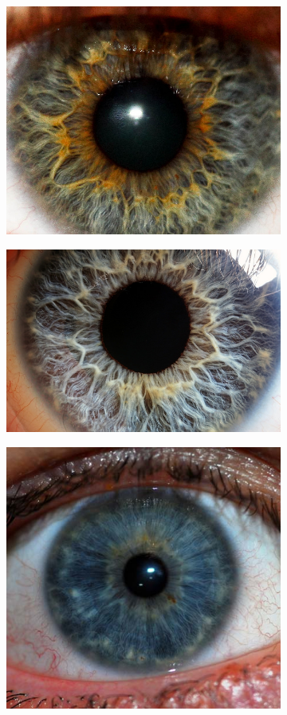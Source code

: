 \documentclass{article}
\begin{document}
\begin{figure}[H]
\begin{subfigure}{.5\textwidth}
  \centering
  \includegraphics[width=0.97\linewidth]{_Figures/raw_data_3.jpg}
  \caption{}
  \label{fig:sample_3}
\end{subfigure}%
\begin{subfigure}{.5\textwidth}
  \centering
  \includegraphics[width=0.97\linewidth]{_Figures/raw_data_4.jpg}
    \caption{}
  \label{fig:sample_4}
\end{subfigure}
\begin{subfigure}{.5\textwidth}
  \centering
  \includegraphics[width=0.6\linewidth]{_Figures/raw_data_5.jpg}

\end{subfigure}
\end{figure}
\end{document}
